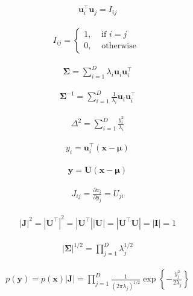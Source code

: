 \documentclass{article}
\begin{document}
\begin{align*}
\mathbf{u}_{i}^{\top} \mathbf{u}_{j} = I_{i j} 
\tag{3.29}
\end{align*}

\begin{align*}
I_{i j} = 
\begin{cases} 
1, & \text{ if } i=j  \\
0, & \text{ otherwise } 
\end{cases}
\tag{3.30}
\end{align*}

\begin{align*}
\boldsymbol{\Sigma} = \sum_{i=1}^{D} \lambda_{i} \mathbf{u}_{i} \mathbf{u}_{i}^{\top} 
\tag{3.31}
\end{align*}

\begin{align*}
\boldsymbol{\Sigma}^{-1} = \sum_{i=1}^{D} \frac{1}{\lambda_{i}} \mathbf{u}_{i} \mathbf{u}_{i}^{\top} 
\tag{3.32}
\end{align*}

\begin{align*}
\Delta^{2} = \sum_{i=1}^{D} \frac{y_{i}^{2}}{\lambda_{i}} 
\tag{3.33}
\end{align*}

\begin{align*}
y_{i} = \mathbf{u}_{i}^{\top}(\mathbf{x}-\boldsymbol{\mu}) 
\tag{3.34}
\end{align*}

\begin{align*}
\mathbf{y} = \mathbf{U}(\mathbf{x}-\boldsymbol{\mu}) 
\tag{3.35}
\end{align*}

\begin{align*}
J_{i j} = \frac{\partial x_{i}}{\partial y_{j}} = U_{j i} 
\tag{3.36}
\end{align*}

\begin{align*}
| \mathbf{J} | ^{2} = \left | \mathbf{U}^{\top} \right | ^{2} = \left | \mathbf{U}^{\top} \right |  | \mathbf{U} | = \left | \mathbf{U}^{\top} \mathbf{U} \right | = | \mathbf{I} | = 1 
\tag{3.37}
\end{align*}

\begin{align*}
| \boldsymbol{\Sigma} | ^{1 / 2} = \prod_{j=1}^{D} \lambda_{j}^{1 / 2} 
\tag{3.38}
\end{align*}

\begin{align*}
p(\mathbf{y}) = p(\mathbf{x})|\mathbf{J}| = \prod_{j=1}^{D} \frac{1}{\left(2 \pi \lambda_{j}\right)^{1 / 2}} \exp \left\{-\frac{y_{j}^{2}}{2 \lambda_{j}}\right\} 
\tag{3.39}
\end{align*}
\end{document}
